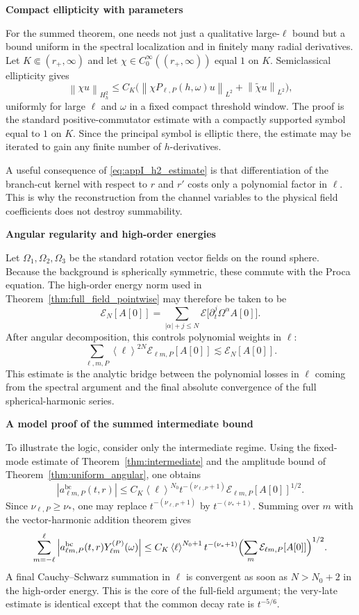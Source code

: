 \documentclass[12pt]{article}
\numberwithin{equation}{section}
\theoremstyle{plain}
\theoremstyle{definition}
\theoremstyle{remark}
\newcommand{\bc}{\mathrm{bc}}
\newcommand{\om}{\omega}
\newcommand{\angles}[1]{\left\langle #1 \right\rangle}
\newcommand{\abs}[1]{\left|#1\right|}
\newcommand{\norm}[1]{\left\|#1\right\|}
\newcommand{\appheading}[1]{\par\medskip\noindent\textbf{#1}\par\smallskip\noindent}
\begin{document}
\appheading{Compact ellipticity with parameters}

For the summed theorem, one needs not just a qualitative large-$\ell$ bound but a bound uniform in the spectral localization and in finitely many radial derivatives.  Let $K\Subset(r_+,\infty)$ and let $\chi\in C_0^\infty((r_+,\infty))$ equal $1$ on $K$.  Semiclassical ellipticity gives
\begin{equation}\label{eq:appI_h2_estimate}
   \norm{\chi u}_{H_h^2}
   \le C_K\bigl(
      \norm{\chi P_{\ell,P}(h,\om)u}_{L^2}
      +\norm{\widetilde\chi u}_{L^2}
   \bigr),
\end{equation}
uniformly for large $\ell$ and $\om$ in a fixed compact threshold window.  The proof is the standard positive-commutator estimate with a compactly supported symbol equal to $1$ on $K$.  Since the principal symbol is elliptic there, the estimate may be iterated to gain any finite number of $h$-derivatives.

A useful consequence of \eqref{eq:appI_h2_estimate} is that differentiation of the branch-cut kernel with respect to $r$ and $r'$ costs only a polynomial factor in $\ell$.  This is why the reconstruction from the channel variables to the physical field coefficients does not destroy summability.

\appheading{Angular regularity and high-order energies}

Let $\Omega_1,\Omega_2,\Omega_3$ be the standard rotation vector fields on the round sphere.  Because the background is spherically symmetric, these commute with the Proca equation.  The high-order energy norm used in Theorem~\ref{thm:full_field_pointwise} may therefore be taken to be
\[
   \mathcal E_N[A[0]]
   =
   \sum_{|\alpha|+j\le N}
      \mathcal E\bigl[\partial_t^j\Omega^\alpha A[0]\bigr].
\]
After angular decomposition, this controls polynomial weights in $\ell$:
\[
   \sum_{\ell,m,P}\angles{\ell}^{2N}
      \mathcal E_{\ell m,P}[A[0]]
   \lesssim \mathcal E_N[A[0]].
\]
This estimate is the analytic bridge between the polynomial losses in $\ell$ coming from the spectral argument and the final absolute convergence of the full spherical-harmonic series.

\appheading{A model proof of the summed intermediate bound}

To illustrate the logic, consider only the intermediate regime.  Using the fixed-mode estimate of Theorem~\ref{thm:intermediate} and the amplitude bound of Theorem~\ref{thm:uniform_angular}, one obtains
\[
   \abs{a_{\ell m,P}^{\bc}(t,r)}
   \le C_K\angles{\ell}^{N_0}
   t^{-(\nu_{\ell,P}+1)}
   \mathcal E_{\ell m,P}[A[0]]^{1/2}.
\]
Since $\nu_{\ell,P}\ge\nu_*$, one may replace $t^{-(\nu_{\ell,P}+1)}$ by $t^{-(\nu_*+1)}$.  Summing over $m$ with the vector-harmonic addition theorem gives
\[
   \sum_{m=-\ell}^{\ell}
      \abs{a_{\ell m,P}^{\bc}(t,r)Y_{\ell m}^{(P)}(\omega)}
   \le
   C_K\angles{\ell}^{N_0+1}
   t^{-(\nu_*+1)}
   \Bigl(\sum_m\mathcal E_{\ell m,P}[A[0]]\Bigr)^{1/2}.
\]
A final Cauchy--Schwarz summation in $\ell$ is convergent as soon as $N>N_0+2$ in the high-order energy.  This is the core of the full-field argument; the very-late estimate is identical except that the common decay rate is $t^{-5/6}$.
\end{document}
